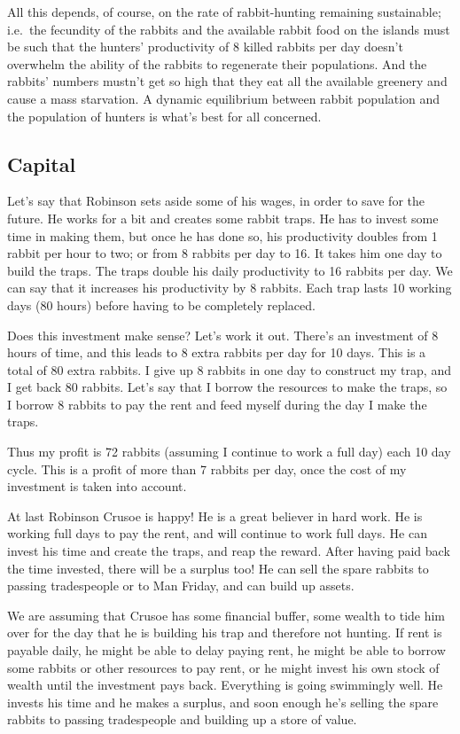 \documentclass[]{tufte-handout}
\begin{document}
All this depends, of course, on the rate of rabbit-hunting remaining
sustainable; i.e.~the fecundity of the rabbits and the available rabbit
food on the islands must be such that the hunters' productivity of 8
killed rabbits per day doesn't overwhelm the ability of the rabbits to
regenerate their populations. And the rabbits' numbers mustn't get so
high that they eat all the available greenery and cause a mass
starvation. A dynamic equilibrium between rabbit population and the
population of hunters is what's best for all concerned.

\hypertarget{capital}{%
\subsection{Capital}\label{capital}}

Let's say that Robinson sets aside some of his wages, in order to save
for the future. He works for a bit and creates some rabbit traps. He has
to invest some time in making them, but once he has done so, his
productivity doubles from 1 rabbit per hour to two; or from 8 rabbits
per day to 16. It takes him one day to build the traps. The traps double
his daily productivity to 16 rabbits per day. We can say that it
increases his productivity by 8 rabbits. Each trap lasts 10 working days
(80 hours) before having to be completely replaced.

Does this investment make sense? Let's work it out. There's an
investment of 8 hours of time, and this leads to 8 extra rabbits per day
for 10 days. This is a total of 80 extra rabbits. I give up 8 rabbits in
one day to construct my trap, and I get back 80 rabbits. Let's say that
I borrow the resources to make the traps, so I borrow 8 rabbits to pay
the rent and feed myself during the day I make the traps.

Thus my profit is 72 rabbits (assuming I continue to work a full day)
each 10 day cycle. This is a profit of more than 7 rabbits per day, once
the cost of my investment is taken into account.

At last Robinson Crusoe is happy! He is a great believer in hard work.
He is working full days to pay the rent, and will continue to work full
days. He can invest his time and create the traps, and reap the reward.
After having paid back the time invested, there will be a surplus too!
He can sell the spare rabbits to passing tradespeople or to Man Friday,
and can build up assets.

We are assuming that Crusoe has some financial buffer, some wealth to
tide him over for the day that he is building his trap and therefore not
hunting. If rent is payable daily, he might be able to delay paying
rent, he might be able to borrow some rabbits or other resources to pay
rent, or he might invest his own stock of wealth until the investment
pays back. Everything is going swimmingly well. He invests his time and
he makes a surplus, and soon enough he's selling the spare rabbits to
passing tradespeople and building up a store of value.
\end{document}
